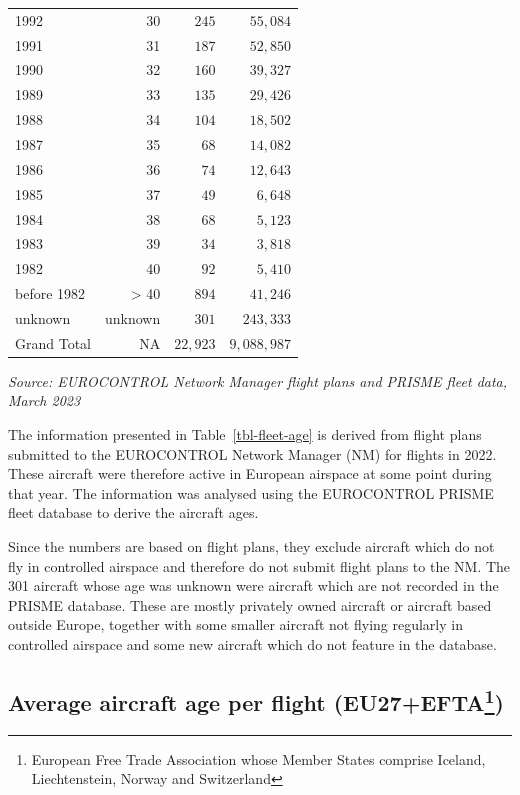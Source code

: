 \documentclass[
  11pt,
  a4paper,
]{book}
\begin{document}
\begin{longtable}{lrrr}
1992 & 30 & $245$ & $55,084$ \\ 
1991 & 31 & $187$ & $52,850$ \\ 
1990 & 32 & $160$ & $39,327$ \\ 
1989 & 33 & $135$ & $29,426$ \\ 
1988 & 34 & $104$ & $18,502$ \\ 
1987 & 35 & $68$ & $14,082$ \\ 
1986 & 36 & $74$ & $12,643$ \\ 
1985 & 37 & $49$ & $6,648$ \\ 
1984 & 38 & $68$ & $5,123$ \\ 
1983 & 39 & $34$ & $3,818$ \\ 
1982 & 40 & $92$ & $5,410$ \\ 
before 1982 & > 40 & $894$ & $41,246$ \\ 
unknown & unknown & $301$ & $243,333$ \\ 
Grand Total & NA & $22,923$ & $9,088,987$ \\ 
\bottomrule
\end{longtable}
\begin{minipage}{\linewidth}
\emph{Source: EUROCONTROL Network Manager flight plans and PRISME fleet data, March 2023}\\
\end{minipage}

The information presented in Table~\ref{tbl-fleet-age} is derived from
flight plans submitted to the EUROCONTROL Network Manager (NM) for
flights in 2022. These aircraft were therefore active in European
airspace at some point during that year. The information was analysed
using the EUROCONTROL PRISME fleet database to derive the aircraft ages.

Since the numbers are based on flight plans, they exclude aircraft which
do not fly in controlled airspace and therefore do not submit flight
plans to the NM. The 301 aircraft whose age was unknown were aircraft
which are not recorded in the PRISME database. These are mostly
privately owned aircraft or aircraft based outside Europe, together with
some smaller aircraft not flying regularly in controlled airspace and
some new aircraft which do not feature in the database.

\hypertarget{average-aircraft-age-per-flight-eu27efta}{%
\subsection[Average aircraft age per flight
(EU27+EFTA)]{\texorpdfstring{Average aircraft age per flight
(EU27+EFTA\footnote{European Free Trade Association whose Member States
  comprise Iceland, Liechtenstein, Norway and Switzerland})}{Average aircraft age per flight (EU27+EFTA)}}\label{average-aircraft-age-per-flight-eu27efta}}
\end{document}
